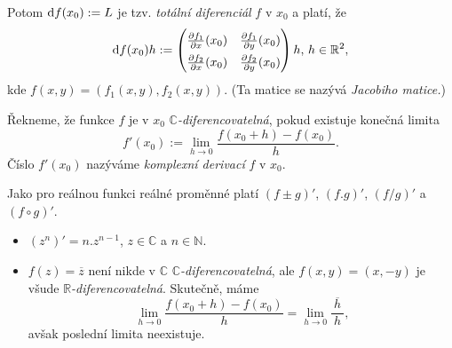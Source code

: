 \begin{note}

Potom $\mathop{}\!\mathrm{d} f(x_0):=L$ je tzv. \emph{totální diferenciál} $f$ v $x_0$ a platí, že $$\diff f(x_0)h:=
\renewcommand\arraystretch{1.5}
\begin{pmatrix}
\frac{\partial f_1}{\partial x}(x_0) & \frac{\partial f_1}{\partial y}(x_0)\\
\frac{\partial f_2}{\partial x}(x_0) & \frac{\partial f_2}{\partial y}(x_0)
\end{pmatrix}h\text{, }h\in \mathbb{R}^2\text{,}$$
kde $f(x,y) = (f_1(x,y),f_2(x,y)).$ (Ta matice se nazývá \emph{Jacobiho matice.})
\end{note} 


\begin{definition}
Řekneme, že funkce $f$ je v $x_0$ $\mathbb{C}$\emph{-diferencovatelná}, pokud existuje konečná limita $$f'(x_0):= \lim_{h \to 0}\frac{f(x_0+h)-f(x_0)}{h}.$$ Číslo $f'(x_0)$ nazýváme \emph{komplexní derivací} $f$ v $x_0$. 
\end{definition}  

\begin{note}
Jako pro reálnou funkci reálné proměnné platí $(f\pm g)'$, $(f.g)'$, $(f/g)'$ a $(f\circ g)'$.
\end{note} 

\begin{example}\mbox{}
\begin{itemize}
    \item $(z^n)' = n.z^{n-1}$, $z\in \mathbb{C}$ a $n\in \mathbb{N}\text{.}$
    \item $f(z) = \overline{z}$ není nikde v $\mathbb{C}$ $\mathbb{C}$\emph{-diferencovatelná}, ale $f(x,y) = (x,-y)$ je všude $\mathbb{R}$\emph{-diferencovatelná}. Skutečně, máme $$\lim_{h\to 0}\frac{f(x_0+h)-f(x_0)}{h} = \lim_{h\to 0}\frac{\ \overline{h}\ }{h}\text{,}$$ avšak poslední limita neexistuje.
\end{itemize}
\end{example}




